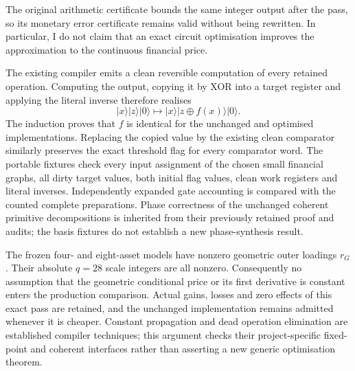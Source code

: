 The original arithmetic certificate bounds the same integer output after
the pass, so its monetary error certificate remains valid without being
rewritten. In particular, I do not claim that an exact circuit optimisation
improves the approximation to the continuous financial price.

The existing compiler emits a clean reversible computation of every retained
operation. Computing the output, copying it by XOR into a target register
and applying the literal inverse therefore realises
\[
 |x\rangle|z\rangle|0\rangle
 \longmapsto |x\rangle|z\mathbin{\oplus} f(x)\rangle|0\rangle.
\]
The induction proves that $f$ is identical for the unchanged and optimised
implementations. Replacing the copied value by the existing clean comparator
similarly preserves the exact threshold flag for every comparator word.
The portable fixtures check every input assignment of the chosen small
financial graphs, all dirty target values, both initial flag values, clean
work registers and literal inverses. Independently expanded gate accounting
is compared with the counted complete preparations. Phase correctness of
the unchanged coherent primitive decompositions is inherited from their
previously retained proof and audits; the basis fixtures do not establish a
new phase-synthesis result.

The frozen four- and eight-asset models have nonzero geometric outer loadings
$r_G$. Their absolute $q=28$ scale integers are all nonzero. Consequently no
assumption that the geometric conditional price or its first derivative is
constant enters the production comparison. Actual gains, losses and zero
effects of this exact pass are retained, and the unchanged implementation
remains admitted whenever it is cheaper. Constant propagation and dead
operation elimination are established compiler techniques; this argument
checks their project-specific fixed-point and coherent interfaces rather
than asserting a new generic optimisation theorem.
